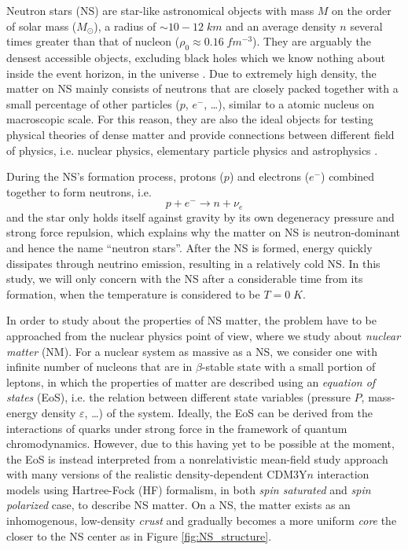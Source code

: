 
Neutron stars (\gls{NS}) are star-like astronomical objects with mass $M$ on the order of solar mass ($M_\odot$), a radius of $\sim 10-12\;km$ and an average density $n$ several times greater than that of nucleon ($\rho_0 \approx 0.16\;fm^{-3}$). They are arguably the densest accessible objects, excluding black holes which we know nothing about inside the event horizon, in the universe \cite{baym1975neutron}. Due to extremely high density, the matter on \gls{NS} mainly consists of neutrons that are closely packed together with a small percentage of other particles ($p$, $e^-$, \ldots), similar to a atomic nucleus on macroscopic scale. For this reason, they are also the ideal objects for testing physical theories of dense matter and provide connections between different field of physics, i.e. nuclear physics, elementary particle physics and astrophysics \cite{lattimer2004physics}.\par
During the \gls{NS}'s formation process, protons ($p$) and electrons ($e^-$) combined together to form neutrons, i.e.
\begin{equation}
        p + e^- \longrightarrow n + \nu_e
\end{equation}
and the star only holds itself against gravity by its own degeneracy pressure and strong force repulsion, which explains why the matter on \gls{NS} is neutron-dominant and hence the name ``neutron stars''. After the \gls{NS} is formed, energy quickly dissipates through neutrino emission, resulting in a relatively cold \gls{NS}. In this study, we will only concern with the \gls{NS} after a considerable time from its formation, when the temperature is considered to be $T=0\;K$.\par
In order to study about the properties of \gls{NS} matter, the problem have to be approached from the nuclear physics point of view, where we study about \emph{nuclear matter} (\gls{NM}). For a nuclear system as massive as a \gls{NS}, we consider one with infinite number of nucleons that are in $\beta$-stable state with a small portion of leptons, in which the properties of matter are described using an \emph{equation of states} (\gls{EoS}), i.e. the relation between different state variables (pressure $P$, mass-energy density $\varepsilon$, \ldots) of the system. Ideally, the \gls{EoS} can be derived from the interactions of quarks under strong force in the framework of quantum chromodynamics. However, due to this having yet to be possible at the moment, the \gls{EoS} is instead interpreted from a nonrelativistic mean-field study approach with many versions of the realistic density-dependent CDM3Y$n$ interaction models \cite{khoa1995equation,khoa2007mean} using Hartree-Fock (\gls{HF}) formalism, in both \emph{spin saturated} and \emph{spin polarized} case, to describe \gls{NS} matter. On a \gls{NS}, the matter exists as an inhomogenous, low-density \emph{crust} and gradually becomes a more uniform \emph{core} the closer to the \gls{NS} center as in Figure \ref{fig:NS_structure}.

